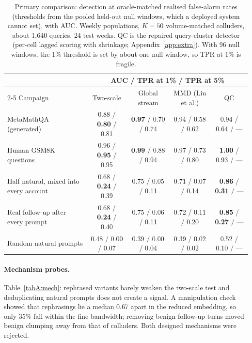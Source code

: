 \begin{table}[h]
\centering
\caption{Primary comparison: detection at oracle-matched realised false-alarm rates (thresholds from the pooled held-out null windows, which a deployed system cannot set), with AUC. Weekly populations, $K=50$ volume-matched colluders, about 1{,}640 queries, 24 test weeks. QC is the repaired query-cluster detector (per-cell lagged scoring with shrinkage; Appendix~\ref{app:extra}). With 96 null windows, the 1\% threshold is set by about one null window, so TPR at 1\% is fragile.}
\label{tabA:oracle}
\footnotesize
\setlength{\tabcolsep}{4pt}
\begin{tabular}{lcccc}
\toprule
& \multicolumn{4}{c}{AUC / TPR at 1\% / TPR at 5\%} \\
\cmidrule(lr){2-5}
Campaign & Two-scale & Global stream & MMD (Liu et al.) & QC \\
\midrule
MetaMathQA (generated) & 0.88 / \textbf{0.80} / 0.81 & \textbf{0.97} / 0.70 / 0.74 & 0.94 / 0.58 / 0.62 & 0.94 / 0.64 / --- \\
Human GSM8K questions & 0.96 / \textbf{0.95} / 0.95 & \textbf{0.99} / 0.88 / 0.94 & 0.97 / 0.73 / 0.80 & \textbf{1.00} / 0.93 / --- \\
Half natural, mixed into every account & 0.68 / \textbf{0.24} / 0.39 & 0.75 / 0.05 / 0.11 & 0.71 / 0.07 / 0.14 & \textbf{0.86} / \textbf{0.31} / --- \\
Real follow-up after every prompt & 0.68 / \textbf{0.24} / 0.40 & 0.75 / 0.06 / 0.11 & 0.72 / 0.11 / 0.20 & \textbf{0.85} / \textbf{0.27} / --- \\
Random natural prompts & 0.48 / 0.00 / 0.07 & 0.39 / 0.00 / 0.04 & 0.39 / 0.02 / 0.02 & 0.52 / 0.10 / --- \\
\bottomrule
\end{tabular}
\end{table}

\paragraph{Mechanism probes.} Table~\ref{tabA:mech}: rephrased variants barely weaken the two-scale test and deduplicating natural prompts does not create a signal. A manipulation check showed that rephrasings lie a median 0.67 apart in the reduced embedding, so only 35\% fall within the fine bandwidth; removing benign follow-up turns moved benign clumping away from that of colluders. Both designed mechanisms were rejected.

